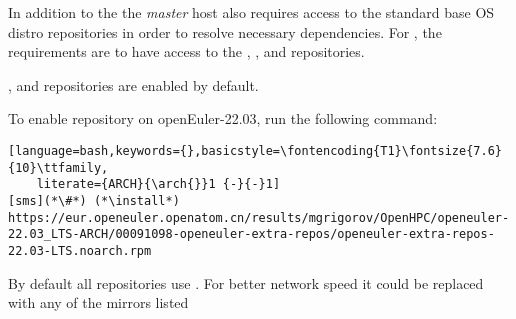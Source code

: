 In addition to the \OHPC{} 
\iftoggle{isxCAT}{and \xCAT{} package repositories,}{package repository,}
the {\em master} host also requires access to the standard base OS distro
repositories in order to resolve necessary dependencies. For \baseOS{}, the
requirements are to have access to the {\color{purple}{OS}}, {\color{purple}{Everything}},
{\color{purple}{EPOL main}} and {\color{purple}{EPOL update}} repositories.

{\color{purple}{OS}}, {\color{purple}{Everything}} and {\color{purple}{EPOL main}} 
repositories are enabled by default.

To enable {\color{purple}{EPOL update}} repository on openEuler-22.03, run the following command:
\begin{lstlisting}[language=bash,keywords={},basicstyle=\fontencoding{T1}\fontsize{7.6}{10}\ttfamily,
	literate={ARCH}{\arch{}}1 {-}{-}1]
[sms](*\#*) (*\install*) https://eur.openeuler.openatom.cn/results/mgrigorov/OpenHPC/openeuler-22.03_LTS-ARCH/00091098-openeuler-extra-repos/openeuler-extra-repos-22.03-LTS.noarch.rpm
\end{lstlisting}

By default all repositories use {\color{blue}{http://repo.openeuler.org}}. 
For better network speed it could be replaced with any of the mirrors listed
\href{https://www.openeuler.org/en/mirror/list/}{\color{blue}{here}}
